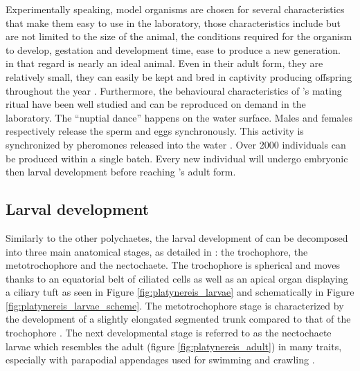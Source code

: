      Experimentally speaking, model organisms are chosen for several characteristics that make them easy to use in the laboratory, those characteristics include but are not limited to the size of the animal, the conditions required for the organism to develop, gestation and development time, ease to produce a new generation.\\
     
     in that regard \platy{} is nearly an ideal animal. Even in their adult form, they are relatively small, they can easily be kept and bred in captivity producing offspring throughout the year \cite{fischer04}. Furthermore, the behavioural characteristics of \platy{}'s mating ritual have been well studied and can be reproduced on demand in the laboratory. The ``nuptial dance'' happens on the water surface. Males and females respectively release the sperm and eggs synchronously. This activity is synchronized by pheromones released into the water \cite{zeeck98}. Over 2000 individuals can be produced within a single batch. Every new individual will undergo embryonic then larval development before reaching \platy{}'s adult form.\\

 
     \subsection{Larval development}
    Similarly to the other polychaetes, the larval development of \platy{} can be decomposed into three main anatomical stages, as detailed in \cite{hauenschild69}: the trochophore, the metotrochophore and the nectochaete. The trochophore is spherical and moves thanks to an equatorial belt of ciliated cells as well as an apical organ displaying a ciliary tuft \cite{rouse99,nielsen04} as seen in Figure \ref{fig:platynereis_larvae} and schematically in Figure \ref{fig:platynereis_larvae_scheme}. The metotrochophore stage is characterized by the development of a slightly elongated segmented trunk compared to that of the trochophore \cite{hacker98}. The next developmental stage is referred to as the nectochaete larvae which resembles the adult (figure \ref{fig:platynereis_adult}) in many traits, especially with parapodial appendages used for swimming and crawling \cite{hacker98}.\\
    
